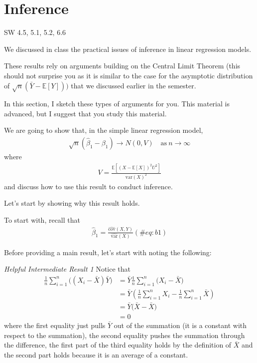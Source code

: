 \documentclass[
  letterpaper,
  DIV=11,
  numbers=noendperiod]{scrreprt}
\begin{document}
\section{Inference}\label{inference}

SW 4.5, 5.1, 5.2, 6.6

We discussed in class the practical issues of inference in linear
regression models.

These results rely on arguments building on the Central Limit Theorem
(this should not surprise you as it is similar to the case for the
asymptotic distribution of \(\sqrt{n}(\bar{Y} - \mathbb{E}[Y]))\) that
we discussed earlier in the semester.

In this section, I sketch these types of arguments for you. This
material is advanced, but I suggest that you study this material.

We are going to show that, in the simple linear regression model,
\begin{align*}
  \sqrt{n}(\hat{\beta}_1 - \beta_1) \rightarrow N(0,V) \quad \textrm{as} \ n \rightarrow \infty
\end{align*} where \begin{align*}
  V = \frac{\mathbb{E}[(X-\mathbb{E}[X])^2 U^2]}{\mathrm{var}(X)^2}
\end{align*} and discuss how to use this result to conduct inference.

Let's start by showing why this result holds.

To start with, recall that \begin{align}
  \hat{\beta}_1 = \frac{\widehat{\mathrm{cov}}(X,Y)}{\widehat{\mathrm{var}}(X)} (\#eq:b1)
\end{align}

Before providing a main result, let's start with noting the following:

\emph{Helpful Intermediate Result 1} Notice that \begin{align*}
  \frac{1}{n}\sum_{i=1}^n \Big( (X_i - \bar{X})\bar{Y}\Big) &= \bar{Y} \frac{1}{n}\sum_{i=1}^n \Big( X_i-\bar{X} \Big) \\
  &= \bar{Y} \left( \frac{1}{n}\sum_{i=1}^n X_i - \frac{1}{n}\sum_{i=1}^n \bar{X} \right) \\
  &= \bar{Y} \Big(\bar{X} - \bar{X} \Big) \\
  &= 0
\end{align*} where the first equality just pulls \(\bar{Y}\) out of the
summation (it is a constant with respect to the summation), the second
equality pushes the summation through the difference, the first part of
the third equality holds by the definition of \(\bar{X}\) and the second
part holds because it is an average of a constant.
\end{document}
